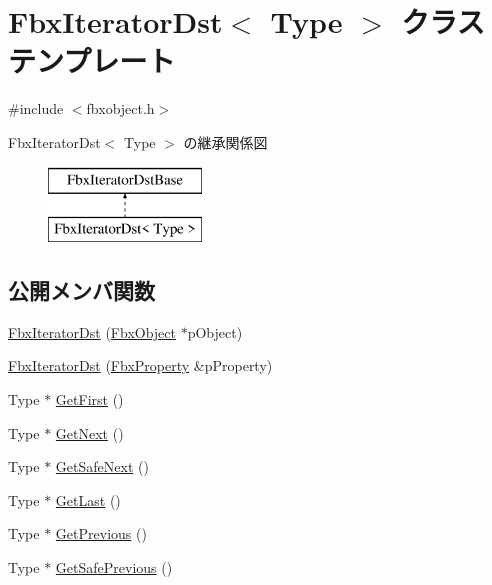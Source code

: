 \hypertarget{class_fbx_iterator_dst}{}\section{Fbx\+Iterator\+Dst$<$ Type $>$ クラステンプレート}
\label{class_fbx_iterator_dst}


{\ttfamily \#include $<$fbxobject.\+h$>$}

Fbx\+Iterator\+Dst$<$ Type $>$ の継承関係図\begin{figure}[H]
\begin{center}
\leavevmode
\includegraphics[height=2.000000cm]{class_fbx_iterator_dst}
\end{center}
\end{figure}
\subsection*{公開メンバ関数}
\begin{DoxyCompactItemize}
\item 
\hyperlink{class_fbx_iterator_dst_a620226076a20ced72d2e4e3e902e447b}{Fbx\+Iterator\+Dst} (\hyperlink{class_fbx_object}{Fbx\+Object} $\ast$p\+Object)
\item 
\hyperlink{class_fbx_iterator_dst_a58a64aa620eda5b7a58aef5198484fde}{Fbx\+Iterator\+Dst} (\hyperlink{class_fbx_property}{Fbx\+Property} \&p\+Property)
\item 
Type $\ast$ \hyperlink{class_fbx_iterator_dst_a7e04f14a4ad50293c81ad1b35b4a206a}{Get\+First} ()
\item 
Type $\ast$ \hyperlink{class_fbx_iterator_dst_a576a29d2fed0e256026665daeae3eb03}{Get\+Next} ()
\item 
Type $\ast$ \hyperlink{class_fbx_iterator_dst_a0db8152df8a6c4be6b35e66b6d666b24}{Get\+Safe\+Next} ()
\item 
Type $\ast$ \hyperlink{class_fbx_iterator_dst_ac3fdecd61bbc92465c40cb45a6557473}{Get\+Last} ()
\item 
Type $\ast$ \hyperlink{class_fbx_iterator_dst_a6548b31d47373fcebc51541b190d133c}{Get\+Previous} ()
\item 
Type $\ast$ \hyperlink{class_fbx_iterator_dst_a8ccdc9811e9315aa7d5d30ff595615ef}{Get\+Safe\+Previous} ()
\end{DoxyCompactItemize}
